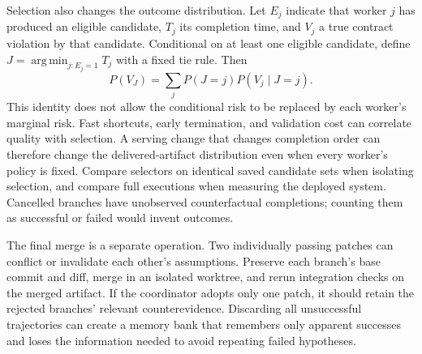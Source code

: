 Selection also changes the outcome distribution. Let $E_j$ indicate that worker $j$ has produced an eligible candidate, $T_j$ its completion time, and $V_j$ a true contract violation by that candidate. Conditional on at least one eligible candidate, define $J=\operatorname*{arg\,min}_{j:E_j=1}T_j$ with a fixed tie rule. Then
\begin{equation}
 P(V_J)=\sum_j P(J=j)P(V_j\mid J=j).
\end{equation}
This identity does not allow the conditional risk to be replaced by each worker's marginal risk. Fast shortcuts, early termination, and validation cost can correlate quality with selection. A serving change that changes completion order can therefore change the delivered-artifact distribution even when every worker's policy is fixed. Compare selectors on identical saved candidate sets when isolating selection, and compare full executions when measuring the deployed system. Cancelled branches have unobserved counterfactual completions; counting them as successful or failed would invent outcomes.

The final merge is a separate operation. Two individually passing patches can conflict or invalidate each other's assumptions. Preserve each branch's base commit and diff, merge in an isolated worktree, and rerun integration checks on the merged artifact. If the coordinator adopts only one patch, it should retain the rejected branches' relevant counterevidence. Discarding all unsuccessful trajectories can create a memory bank that remembers only apparent successes and loses the information needed to avoid repeating failed hypotheses.

